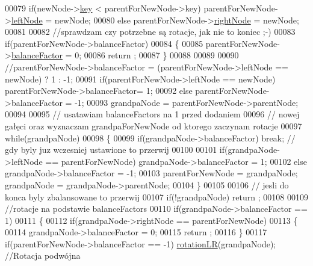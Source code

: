 \begin{DoxyCode}
00079           \textcolor{keywordflow}{if}(newNode->\hyperlink{class_a_v_l_tree_node_a717c2f6c33504a065570802e95189a57}{key} < parentForNewNode->key) parentForNewNode->\hyperlink{class_a_v_l_tree_node_afc53d4774f375c23795c9eb598f4d7cd}{leftNode} = newNode;
00080           \textcolor{keywordflow}{else} parentForNewNode->\hyperlink{class_a_v_l_tree_node_a51dfb148f27625c89a3a153760517c38}{rightNode} = newNode;
00081 
00082           \textcolor{comment}{//sprawdzam czy potrzebne są rotacje, jak nie to koniec ;-)}
00083           \textcolor{keywordflow}{if}(parentForNewNode->balanceFactor)
00084           \{
00085             parentForNewNode->\hyperlink{class_a_v_l_tree_node_a212c57dab467b42c3ddc50b2aecc05ad}{balanceFactor} = 0;
00086             return ;
00087           \}
00088 
00089 
00090           \textcolor{comment}{//parentForNewNode->balanceFactor = (parentForNewNode->leftNode == newNode) ? 1 : -1;}
00091           \textcolor{keywordflow}{if}(parentForNewNode->leftNode == newNode) parentForNewNode->balanceFactor= 1;
00092           \textcolor{keywordflow}{else}  parentForNewNode->balanceFactor = -1;
00093           grandpaNode = parentForNewNode->parentNode;
00094 
00095           \textcolor{comment}{// usatawiam balanceFactors na 1 przed dodaniem}
00096           \textcolor{comment}{// nowej gałęci oraz wyznaczam grandpaForNewNode od ktorego zaczynam rotacje}
00097           \textcolor{keywordflow}{while}(grandpaNode)
00098           \{
00099             \textcolor{keywordflow}{if}(grandpaNode->balanceFactor) \textcolor{keywordflow}{break}; \textcolor{comment}{// gdy byly juz wczesniej ustawione to przerwij}
00100 
00101             \textcolor{keywordflow}{if}(grandpaNode->leftNode == parentForNewNode) grandpaNode->balanceFactor = 1;
00102             \textcolor{keywordflow}{else} grandpaNode->balanceFactor = -1;
00103             parentForNewNode = grandpaNode; grandpaNode = grandpaNode->parentNode;
00104           \}
00105 
00106           \textcolor{comment}{// jesli do konca byly zbalansowane to przerwij}
00107           \textcolor{keywordflow}{if}(!grandpaNode) return ;
00108 
00109           \textcolor{comment}{//rotacje na podstawie balanceFactors}
00110           \textcolor{keywordflow}{if}(grandpaNode->balanceFactor == 1)
00111           \{
00112             \textcolor{keywordflow}{if}(grandpaNode->rightNode == parentForNewNode)
00113             \{
00114               grandpaNode->balanceFactor = 0;
00115               return ;
00116             \}
00117             \textcolor{keywordflow}{if}(parentForNewNode->balanceFactor == -1) \hyperlink{class_a_v_l_tree_a5751bfd512b5dfe32060a649f697d5f0}{rotationLR}(grandpaNode); \textcolor{comment}{//Rotacja podwójna
}
\end{DoxyCode}

